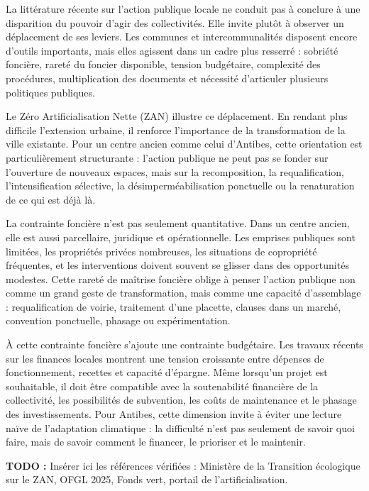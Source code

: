 \documentclass[11pt,a4paper]{report}
\newcommand{\todo}[1]{\textcolor{todored}{\textbf{TODO :} #1}}
\begin{document}
La littérature récente sur l'action publique locale ne conduit pas à conclure à une disparition du pouvoir d'agir des collectivités. Elle invite plutôt à observer un déplacement de ses leviers. Les communes et intercommunalités disposent encore d'outils importants, mais elles agissent dans un cadre plus resserré : sobriété foncière, rareté du foncier disponible, tension budgétaire, complexité des procédures, multiplication des documents et nécessité d'articuler plusieurs politiques publiques.

Le Zéro Artificialisation Nette (ZAN) illustre ce déplacement. En rendant plus difficile l'extension urbaine, il renforce l'importance de la transformation de la ville existante. Pour un centre ancien comme celui d'Antibes, cette orientation est particulièrement structurante : l'action publique ne peut pas se fonder sur l'ouverture de nouveaux espaces, mais sur la recomposition, la requalification, l'intensification sélective, la désimperméabilisation ponctuelle ou la renaturation de ce qui est déjà là.

La contrainte foncière n'est pas seulement quantitative. Dans un centre ancien, elle est aussi parcellaire, juridique et opérationnelle. Les emprises publiques sont limitées, les propriétés privées nombreuses, les situations de copropriété fréquentes, et les interventions doivent souvent se glisser dans des opportunités modestes. Cette rareté de maîtrise foncière oblige à penser l'action publique non comme un grand geste de transformation, mais comme une capacité d'assemblage : requalification de voirie, traitement d'une placette, clauses dans un marché, convention ponctuelle, phasage ou expérimentation.

À cette contrainte foncière s'ajoute une contrainte budgétaire. Les travaux récents sur les finances locales montrent une tension croissante entre dépenses de fonctionnement, recettes et capacité d'épargne. Même lorsqu'un projet est souhaitable, il doit être compatible avec la soutenabilité financière de la collectivité, les possibilités de subvention, les coûts de maintenance et le phasage des investissements. Pour Antibes, cette dimension invite à éviter une lecture naïve de l'adaptation climatique : la difficulté n'est pas seulement de savoir quoi faire, mais de savoir comment le financer, le prioriser et le maintenir.

\todo{Insérer ici les références vérifiées : Ministère de la Transition écologique sur le ZAN, OFGL 2025, Fonds vert, portail de l'artificialisation.}
\end{document}

